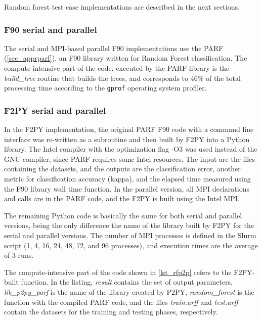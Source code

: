 Random forest test case implementations are described in the next sections.

%
%
%
\subsubsection{F90 serial and parallel} %
\label{sec_rfimplf90}

The serial and MPI-based parallel F90 implementations use the PARF (\autoref {sec_apprparf}), an F90 library written for Random Forest classification. The compute-intensive part of the code, executed by the PARF library is the \textit {build\_tree} routine that builds the trees, and corresponds to 46\% of the total processing time according to the \texttt {gprof} operating system profiler. 

%
%
%
\subsubsection{F2PY serial and parallel} %
\label{sec_rfimplf2py}

In the F2PY implementation, the original PARF F90 code with a command line interface was re-written as a subroutine and then built by F2PY into a Python library. The Intel compiler with the optimization flag -O3 was used instead of the GNU compiler, since PARF requires some Intel resources. The input are the files containing the datasets, and the outputs are the classification error, another metric for classification accuracy (kappa), and the elapsed time measured using the F90 library wall time function. In the parallel version, all MPI declarations and calls are in the PARF code, and the F2PY is built using the Intel MPI. 

The remaining Python code is basically the same for both serial and parallel versions, being the only difference the name of the library built by F2PY for the serial and parallel versions. The number of MPI processes is defined in the Slurm script (1, 4, 16, 24, 48, 72, and 96 processes), and execution times are the average of 3 runs.

The compute-intensive part of the code shown in \autoref {lst_rfp2p} refers to the F2PY-built function. In the listing, \textit {result} contains the set of output parameters, \textit {lib\_p2py\_parf} is the name of the library created by P2PY, \textit {random\_forest} is the function with the compiled PARF code, and the files \textit {train.arff} and \textit {test.arff} contain the datasets for the training and testing phases, respectively.

